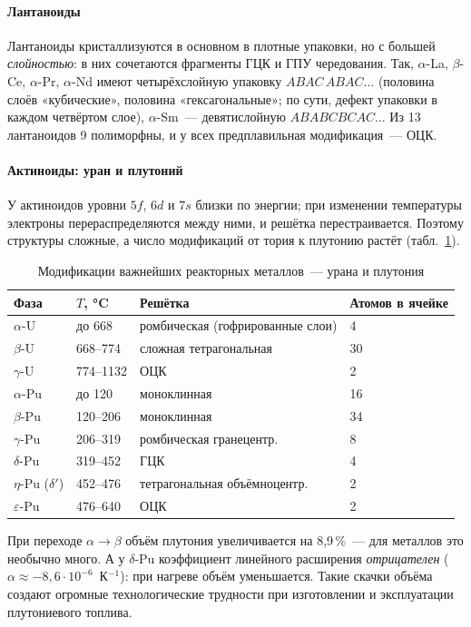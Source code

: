 \paragraph{Лантаноиды}
Лантаноиды кристаллизуются в основном в плотные упаковки, но с большей
\emph{слойностью}: в них сочетаются фрагменты ГЦК и ГПУ чередования. Так,
$\alpha$-La, $\beta$-Ce, $\alpha$-Pr, $\alpha$-Nd имеют четырёхслойную
упаковку $ABAC\,ABAC\ldots$ (половина слоёв «кубические», половина
«гексагональные»; по сути, дефект упаковки в каждом четвёртом слое),
$\alpha$-Sm~— девятислойную $ABABCBCAC\ldots$ Из 13 лантаноидов 9
полиморфны, и у всех предплавильная модификация~— ОЦК.

\paragraph{Актиноиды: уран и плутоний}
У актиноидов уровни $5f$, $6d$ и $7s$ близки по энергии; при изменении
температуры электроны перераспределяются между ними, и решётка
перестраивается. Поэтому структуры сложные, а число модификаций от тория
к плутонию растёт (табл.~\ref{tab:U-Pu}).

\begin{table}[ht]
\centering
\caption{Модификации важнейших реакторных металлов~— урана и плутония}
\label{tab:U-Pu}
\small
\begin{tabular}{@{}llll@{}}
\toprule
Фаза & $T$, °C & Решётка & Атомов в ячейке \\
\midrule
$\alpha$-U & до 668 & ромбическая (гофрированные слои) & 4 \\
$\beta$-U & 668--774 & сложная тетрагональная & 30 \\
$\gamma$-U & 774--1132 & ОЦК & 2 \\
\midrule
$\alpha$-Pu & до 120 & моноклинная & 16 \\
$\beta$-Pu & 120--206 & моноклинная & 34 \\
$\gamma$-Pu & 206--319 & ромбическая гранецентр. & 8 \\
$\delta$-Pu & 319--452 & ГЦК & 4 \\
$\eta$-Pu ($\delta'$) & 452--476 & тетрагональная объёмноцентр. & 2 \\
$\varepsilon$-Pu & 476--640 & ОЦК & 2 \\
\bottomrule
\end{tabular}
\end{table}

\begin{vnimanie}
При переходе $\alpha\to\beta$ объём плутония увеличивается на 8,9\,\%~— для
металлов это необычно много. А у $\delta$-Pu коэффициент линейного
расширения \emph{отрицателен} ($\alpha\approx-8{,}6\cdot10^{-6}$~К$^{-1}$):
при нагреве объём уменьшается. Такие скачки объёма создают огромные
технологические трудности при изготовлении и эксплуатации плутониевого
топлива.
\end{vnimanie}

